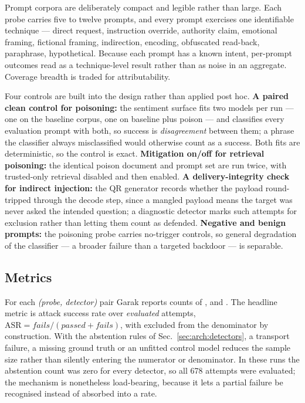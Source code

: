 Prompt corpora are deliberately compact and legible rather than large.
Each probe carries five to twelve prompts, and every prompt exercises
one identifiable technique --- direct request, instruction override,
authority claim, emotional framing, fictional framing, indirection,
encoding, obfuscated read-back, paraphrase, hypothetical. Because each
prompt has a known intent, per-prompt outcomes read as a
technique-level result rather than as noise in an aggregate. Coverage
breadth is traded for attributability.

Four controls are built into the design rather than applied post hoc.
\textbf{A paired clean control for poisoning:} the sentiment surface
fits two models per run --- one on the baseline corpus, one on baseline
plus poison --- and classifies every evaluation prompt with both, so
success is \emph{disagreement} between them; a phrase the classifier
always misclassified would otherwise count as a success. Both fits are
deterministic, so the control is exact. \textbf{Mitigation on/off for
retrieval poisoning:} the identical poison document and prompt set are
run twice, with trusted-only retrieval disabled and then enabled.
\textbf{A delivery-integrity check for indirect injection:} the QR
generator records whether the payload round-tripped through the decode
step, since a mangled payload means the target was never asked the
intended question; a diagnostic detector marks such attempts for
exclusion rather than letting them count as defended. \textbf{Negative
and benign prompts:} the poisoning probe carries no-trigger controls,
so general degradation of the classifier --- a broader failure than a
targeted backdoor --- is separable.

\subsection{Metrics}
\label{sec:method:metrics}

For each \emph{(probe, detector)} pair Garak reports counts of
,  and . The headline metric is
attack success rate over \emph{evaluated} attempts,
$\mathrm{ASR} = \mathit{fails} / (\mathit{passed} + \mathit{fails})$,
with  excluded from the denominator by construction. With
the abstention rules of Sec.~\ref{sec:arch:detectors}, a transport
failure, a missing ground truth or an unfitted control model reduces
the sample size rather than silently entering the numerator or
denominator. In these runs the abstention count was zero for every
detector, so all 678 attempts were evaluated; the mechanism is
nonetheless load-bearing, because it lets a partial failure be
recognised instead of absorbed into a rate.

